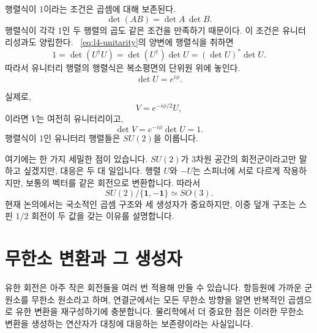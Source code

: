 행렬식이 1이라는 조건은 곱셈에 대해 보존된다.
\begin{equation}
\det(AB)=\det A\,\det B.
\end{equation}
행렬식이 각각 1인 두 행렬의 곱도 같은 조건을 만족하기 때문이다. 이 조건은 유니터리성과도 양립한다. ~\eqref{eq:l4-unitarity}의 양변에 행렬식을 취하면
\begin{equation}
1=\det(U^\dagger U)
=\det(U^\dagger)\det U
=(\det U)^*\det U.
\end{equation}
따라서 유니터리 행렬의 행렬식은 복소평면의 단위원 위에 놓인다.
\begin{equation}
\det U=e^{i\phi}.
\end{equation}

\begin{classroomqa}
\end{classroomqa}

실제로,
\begin{equation}
V=e^{-i\phi/2}U,
\end{equation}
이라면 \(V\)는 여전히 유니터리이고,
\begin{equation}
\det V=e^{-i\phi}\det U=1.
\end{equation}
행렬식이 1인 유니터리 행렬들은 \(SU(2)\)을 이룹니다.

여기에는 한 가지 세밀한 점이 있습니다. \(SU(2)\)가 3차원 공간의 회전군이라고만 말하고 싶겠지만, 대응은 두 대 일입니다. 행렬 \(U\)와 \(-U\)는 스피너에 서로 다르게 작용하지만, 보통의 벡터를 같은 회전으로 변환합니다. 따라서
\begin{equation}
SU(2)/\{\boldsymbol 1,-\boldsymbol 1\}\simeq SO(3).
\end{equation}
현재 논의에서는 국소적인 곱셈 구조와 세 생성자가 중요하지만, 이중 덮개 구조는 스핀 1/2 회전이 두 값을 갖는 이유를 설명합니다.

\section{무한소 변환과 그 생성자}

유한 회전은 아주 작은 회전들을 여러 번 적용해 만들 수 있습니다. 항등원에 가까운 군 원소를 무한소 원소라고 하며, 연결군에서는 모든 무한소 방향을 알면 반복적인 곱셈으로 유한 변환을 재구성하기에 충분합니다. 물리학에서 더 중요한 점은 이러한 무한소 변환을 생성하는 연산자가 대칭에 대응하는 보존량이라는 사실입니다.


